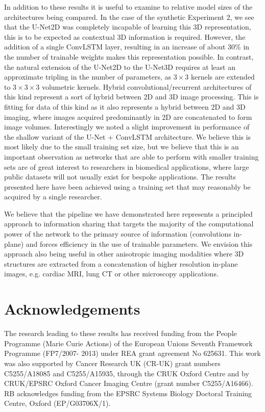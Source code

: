\documentclass[journal,transmag]{IEEEtran}
\begin{document}
In addition to these results it is useful to examine to relative model sizes of the architectures being compared. In the case of the synthetic Experiment 2, we see that the U-Net2D was completely incapable of learning this 3D representation, this is to be expected as contextual 3D information is required. However, the addition of a single ConvLSTM layer, resulting in an increase of about 30\% in the number of trainable weights makes this representation possible. In contrast, the natural extension of the U-Net2D to the U-Net3D requires at least an approximate tripling in the number of parameters, as $3\times3$ kernels are extended to $3\times3\times3$ volumetric kernels. Hybrid convolutional/recurrent architectures of this kind represent a sort of hybrid between 2D and 3D image processing. This is fitting for data of this kind as it also represents a hybrid between 2D and 3D imaging, where images acquired predominantly in 2D are concatenated to form image volumes. Interestingly we noted a slight improvement in performance of the shallow variant of the U-Net + ConvLSTM architecture. We believe this is most likely due to the small training set size, but we believe that this is an important observation as networks that are able to perform with smaller training sets are of great interest to researchers in biomedical applications, where large public datasets will not usually exist for bespoke applications. The results presented here have been achieved using a training set that may reasonably be acquired by a single researcher. 

We believe that the pipeline we have demonstrated here represents a principled approach to information sharing that targets the majority of the computational power of the network to the primary source of information (convolutions in-plane) and forces efficiency in the use of trainable parameters. We envision this approach also being useful in other anisotropic imaging modalities where 3D structures are extracted from a concatenation of higher resolution in-plane images, e.g. cardiac MRI, lung CT or other microscopy applications.  

\section{Acknowledgements}

The research leading to these results has received funding
from the People Programme (Marie Curie Actions) of the
European Unions Seventh Framework Programme (FP7/2007-
2013) under REA grant agreement No 625631. This work
was also supported by Cancer Research UK (CR-UK) grant
numbers C5255/A18085 and C5255/A15935, through the
CRUK Oxford Centre and by CRUK/EPSRC Oxford Cancer Imaging Centre (grant number C5255/A16466). RB acknowledges funding from the
EPSRC Systems Biology Doctoral Training Centre, Oxford
(EP/G03706X/1).



\end{document}
